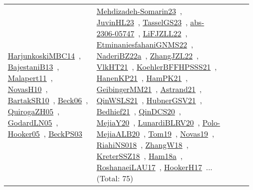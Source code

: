 {\begin{longtable}{lp{3cm}>{\raggedright\arraybackslash}p{6cm}>{\raggedright\arraybackslash}p{6cm}>{\raggedright\arraybackslash}p{8cm}}
\href{../works/HarjunkoskiMBC14.pdf}{HarjunkoskiMBC14}~\cite{HarjunkoskiMBC14}, \href{../works/BajestaniB13.pdf}{BajestaniB13}~\cite{BajestaniB13}, \href{../works/Malapert11.pdf}{Malapert11}~\cite{Malapert11}, \href{../works/NovasH10.pdf}{NovasH10}~\cite{NovasH10}, \href{../works/BartakSR10.pdf}{BartakSR10}~\cite{BartakSR10}, \href{../works/Beck06.pdf}{Beck06}~\cite{Beck06}, \href{../works/QuirogaZH05.pdf}{QuirogaZH05}~\cite{QuirogaZH05}, \href{../works/GodardLN05.pdf}{GodardLN05}~\cite{GodardLN05}, \href{../works/Hooker05.pdf}{Hooker05}~\cite{Hooker05}, \href{../works/BeckPS03.pdf}{BeckPS03}~\cite{BeckPS03} & \href{../works/Mehdizadeh-Somarin23.pdf}{Mehdizadeh-Somarin23}~\cite{Mehdizadeh-Somarin23}, \href{../works/JuvinHL23.pdf}{JuvinHL23}~\cite{JuvinHL23}, \href{../works/TasselGS23.pdf}{TasselGS23}~\cite{TasselGS23}, \href{../works/abs-2306-05747.pdf}{abs-2306-05747}~\cite{abs-2306-05747}, \href{../works/LiFJZLL22.pdf}{LiFJZLL22}~\cite{LiFJZLL22}, \href{../works/EtminaniesfahaniGNMS22.pdf}{EtminaniesfahaniGNMS22}~\cite{EtminaniesfahaniGNMS22}, \href{../works/NaderiBZ22a.pdf}{NaderiBZ22a}~\cite{NaderiBZ22a}, \href{../works/ZhangJZL22.pdf}{ZhangJZL22}~\cite{ZhangJZL22}, \href{../works/VlkHT21.pdf}{VlkHT21}~\cite{VlkHT21}, \href{../works/KoehlerBFFHPSSS21.pdf}{KoehlerBFFHPSSS21}~\cite{KoehlerBFFHPSSS21}, \href{../works/HanenKP21.pdf}{HanenKP21}~\cite{HanenKP21}, \href{../works/HamPK21.pdf}{HamPK21}~\cite{HamPK21}, \href{../works/GeibingerMM21.pdf}{GeibingerMM21}~\cite{GeibingerMM21}, \href{../works/Astrand21.pdf}{Astrand21}~\cite{Astrand21}, \href{../works/QinWSLS21.pdf}{QinWSLS21}~\cite{QinWSLS21}, \href{../works/HubnerGSV21.pdf}{HubnerGSV21}~\cite{HubnerGSV21}, \href{../works/Bedhief21.pdf}{Bedhief21}~\cite{Bedhief21}, \href{../works/QinDCS20.pdf}{QinDCS20}~\cite{QinDCS20}, \href{../works/MejiaY20.pdf}{MejiaY20}~\cite{MejiaY20}, \href{../works/LunardiBLRV20.pdf}{LunardiBLRV20}~\cite{LunardiBLRV20}, \href{../works/Polo-MejiaALB20.pdf}{Polo-MejiaALB20}~\cite{Polo-MejiaALB20}, \href{../works/Tom19.pdf}{Tom19}~\cite{Tom19}, \href{../works/Novas19.pdf}{Novas19}~\cite{Novas19}, \href{../works/RiahiNS018.pdf}{RiahiNS018}~\cite{RiahiNS018}, \href{../works/ZhangW18.pdf}{ZhangW18}~\cite{ZhangW18}, \href{../works/KreterSSZ18.pdf}{KreterSSZ18}~\cite{KreterSSZ18}, \href{../works/Ham18a.pdf}{Ham18a}~\cite{Ham18a}, \href{../works/RoshanaeiLAU17.pdf}{RoshanaeiLAU17}~\cite{RoshanaeiLAU17}, \href{../works/HookerH17.pdf}{HookerH17}~\cite{HookerH17}... (Total: 75)\\

\end{longtable}}
